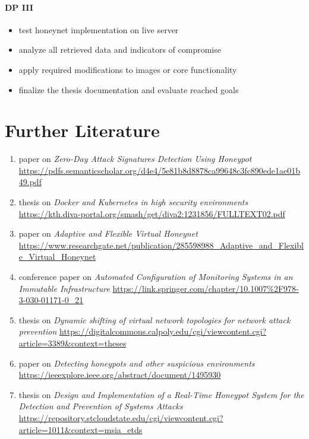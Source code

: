 \documentclass[12pt,a4paper,twoside]{report}
\begin{document}
\subsubsection{DP III}\label{dp-iii}

\begin{itemize}
\item
  test honeynet implementation on live server
\item
  analyze all retrieved data and indicators of compromise
\item
  apply required modifications to images or core functionality
\item
  finalize the thesis documentation and evaluate reached goals
\end{itemize}

\chapter{Further Literature}\label{further-literature}

\begin{enumerate}
	\item paper on \emph{Zero-Day Attack Signatures Detection Using Honeypot} \url{https://pdfs.semanticscholar.org/d4e4/5e81b8d8878ca99648c3fc890ede1ae01b49.pdf}
	
	\item thesis on \emph{Docker and Kubernetes in high security environments} \url{https://kth.diva-portal.org/smash/get/diva2:1231856/FULLTEXT02.pdf}
	
	\item paper on \emph{Adaptive and Flexible Virtual Honeynet}
	\url{https://www.researchgate.net/publication/285598988_Adaptive_and_Flexible_Virtual_Honeynet}
	
	\item conference paper on \emph{Automated Configuration of Monitoring Systems in an Immutable Infrastructure} \url{https://link.springer.com/chapter/10.1007%2F978-3-030-01171-0_21}
		
	\item thesis on \emph{Dynamic shifting of virtual network topologies for network attack prevention} \url{https://digitalcommons.calpoly.edu/cgi/viewcontent.cgi?article=3389&context=theses}
	
	\item paper on \emph{Detecting honeypots and other suspicious environments} \url{https://ieeexplore.ieee.org/abstract/document/1495930}
	
	\item thesis on \emph{Design and Implementation of a Real-Time Honeypot System for the Detection and Prevention of Systems Attacks} \url{https://repository.stcloudstate.edu/cgi/viewcontent.cgi?article=1011&context=msia_etds}
\end{enumerate}

\newpage


\end{document}

